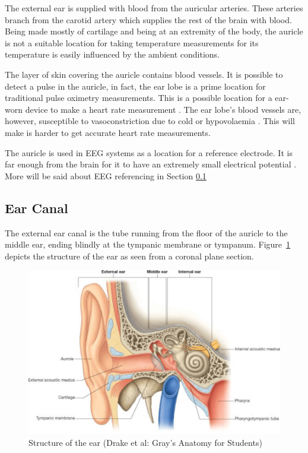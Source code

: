 The external ear is supplied with blood from the auricular arteries. These arteries branch from the carotid artery which supplies the rest of the brain with blood. Being made mostly of cartilage and being at an extremity of the body, the auricle is not a suitable location for taking temperature measurements for its temperature is easily influenced by the ambient conditions.

The layer of skin covering the auricle contains blood vessels. It is possible to detect a pulse in the auricle, in fact, the ear lobe is a prime location for traditional pulse oximetry measurements. This is a possible location for a ear-worn device to make a heart rate measurement \citep{poh2010motion}. The ear lobe's blood vessels are, however, susceptible to vasoconstriction due to cold or hypovolaemia \citep{WHO2011UsingPulseOxi}. This will make is harder to get accurate heart rate measurements.

The auricle is used in EEG systems as a location for a reference electrode. It is far enough from the brain for it to have an extremely small electrical potential \citep{nunez2006electric}. More will be said about EEG referencing in Section \ref{}

\subsection{Ear Canal}
The external ear canal is the tube running from the floor of the auricle to the middle ear, ending blindly at the tympanic membrane or tympanum. Figure~\ref{fig:EarSection} depicts the structure of the ear as seen from a coronal plane section.
 
\begin{figure}
   \centering
   \includegraphics[scale=0.7]{figs/EarSection}
   \caption{Structure of the ear (Drake et al: Gray's Anatomy for Students)}
   \label{fig:EarSection}
\end{figure}
 
